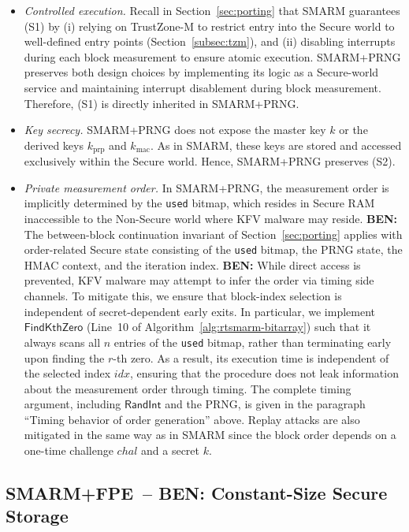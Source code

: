 \documentclass{ieeeaccess}
\DeclareRobustCommand{\ben}[1]{{\color{BENcolor}\textbf{BEN:} #1}}
\newcommand{\rtsmarmone}{SMARM+PRNG\xspace}
\newcommand{\rtsmarmtwo}{SMARM+FPE\xspace}
\begin{document}
\begin{itemize}
  \item[(S1)] \emph{Controlled execution.}
  Recall in Section~\ref{sec:porting} that SMARM guarantees (S1) by (i) relying on TrustZone-M to restrict entry into the Secure world to well-defined entry points (Section~\ref{subsec:tzm}), and (ii) disabling interrupts during each block measurement to ensure atomic execution.
  \rtsmarmone preserves both design choices by implementing its logic as a Secure-world service and maintaining interrupt disablement during block measurement.
  Therefore, (S1) is directly inherited in \rtsmarmone.

  \item[(S2)] \emph{Key secrecy.}
  \rtsmarmone does not expose the master key $k$ or the derived keys $k_{\mathrm{prp}}$ and $k_{\mathrm{mac}}$.
  As in SMARM, these keys are stored and accessed exclusively within the Secure world.
  Hence, \rtsmarmone preserves (S2).

  \item[(S3)] \emph{Private measurement order.}
  In \rtsmarmone, the measurement order is implicitly determined by the \texttt{used} bitmap, which resides in Secure RAM inaccessible to the Non-Secure world where KFV malware may reside.
  \ben{The between-block continuation invariant of Section~\ref{sec:porting} applies with order-related Secure state consisting of the \texttt{used} bitmap, the PRNG state, the HMAC context, and the iteration index.}
  \ben{While direct access is prevented, KFV malware may attempt to infer the order via timing side channels.
  To mitigate this, we ensure that block-index selection is independent of secret-dependent early exits.
  In particular, we implement $\mathsf{FindKthZero}$ (Line~10 of Algorithm~\ref{alg:rtsmarm-bitarray}) such that it always scans all $n$ entries of the \texttt{used} bitmap, rather than terminating early upon finding the $r$-th zero.
  As a result, its execution time is independent of the selected index $idx$, ensuring that the procedure does not leak information about the measurement order through timing.
  The complete timing argument, including $\mathsf{RandInt}$ and the PRNG, is given in the paragraph ``Timing behavior of order generation'' above.}
  Replay attacks are also mitigated in the same way as in SMARM since the block order depends on a one-time challenge $chal$ and a secret $k$.
\end{itemize}


\subsection{\rtsmarmtwo\ -- \ben{Constant-Size Secure Storage}}
\label{sec:rtsmarm-fpe}
\end{document}
